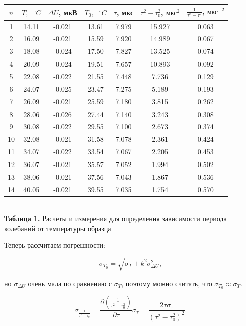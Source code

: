 \documentclass[a4paper,12pt]{article} %
\begin{document}
\begin{center}
\begin{tabular}{|c|c|c|c|c|c|c|}\hline
$ n $ & $ T, \text{ } ^\circ C $ & $ \Delta U $, мкВ & $ T_{0}, \text{ } ^\circ C $ & $ \tau $, мкс & $ \tau^2 - \tau_{0}^2 $, $ \text{мкс}^2 $ & $ \frac{1}{\tau^2 - \tau_{0}^2} $, $ \text{мкс}^{-2} $ \\\hline
1 & 14.11 & -0.021 & 13.61 & 7.979 & 15.927 & 0.063 \\\hline
2 & 16.09 & -0.021 & 15.59 & 7.920 & 14.989 & 0.067 \\\hline
3 & 18.08 & -0.024 & 17.50 & 7.827 & 13.525 & 0.074 \\\hline
4 & 20.09 & -0.024 & 19.51 & 7.657 & 10.893 & 0.092 \\\hline
5 & 22.08 & -0.022 & 21.55 & 7.448 & 7.736 & 0.129\\\hline
6 & 24.07 & -0.025 & 23.47 & 7.275 & 5.189 & 0.193 \\\hline
7 & 26.09 & -0.021 & 25.59 & 7.180 & 3.815 & 0.262 \\\hline
8 & 28.06 & -0.026 & 27.44 & 7.140 & 3.243 & 0.308 \\\hline
9 & 30.08 & -0.022 & 29.55 & 7.100 & 2.673 & 0.374 \\\hline
10 & 32.08 & -0.021 & 31.58 & 7.078 & 2.361 & 0.424 \\\hline
11 & 34.07 & -0.022 & 33.54 & 7.067 & 2.205 & 0.453 \\\hline
12 & 36.07 & -0.021 & 35.57 & 7.052 & 1.994 & 0.502 \\\hline
13 & 38.06 & -0.021 & 37.56 & 7.043 & 1.867 & 0.536 \\\hline
14 & 40.05 & -0.021 & 39.55 & 7.035 & 1.754 & 0.570 \\\hline
\end{tabular} \\
\hfill \break \textbf {Таблица 1.} Расчеты и измерения для определения зависимости периода колебаний от температуры образца\\
\end{center}

\hfill \break Теперь рассчитаем погрешности:

$$
\sigma_{T_{0}} = \sqrt{\sigma_{T} + k^2 \sigma_{\Delta U}^2},
$$

\hfill \break но $\sigma_{\Delta U}$ очень мала по сравнению с $\sigma_{T}$, поэтому можно считать, что $\sigma_{T_{0}} \approx \sigma_{T}$.

$$
\sigma_{\frac{1}{\tau^2 - \tau_{0}^2}} = \frac{\partial \left( \frac{1}{\tau^2 - \tau_{0}^2} \right)}{\partial \tau} \sigma_{\tau} = \frac{2\tau \sigma_{\tau}}{\left(\tau^2 - \tau_{0}^2\right)^2}.
$$
\end{document}

